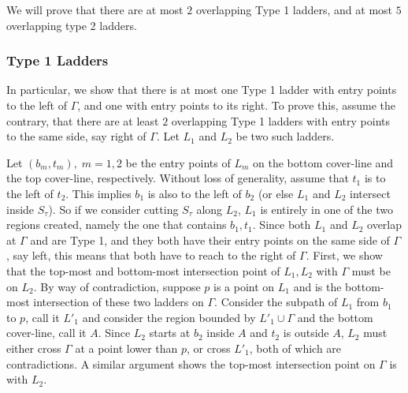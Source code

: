 \documentclass[pdflatex,sn-mathphys-num]{sn-jnl}
\theoremstyle{thmstyleone}
\begin{document}
    We will prove that there are at most $2$ overlapping Type 1 ladders, and at most $5$ overlapping type 2 ladders.

    \subsubsection*{Type 1 Ladders}
    In particular, we show that there is at most one Type 1 ladder with entry points to the left of $\Gamma$, and one with entry points to its right.
    To prove this, assume the contrary, that there are at least $2$ overlapping 
    Type 1 ladders with entry points to the same side, say right of $\Gamma$. Let $L_1$ and $L_2$ be two such ladders. 
   
    Let $(b_m, t_m),\; m = 1,2$ be the entry points of $L_m$ on the bottom cover-line and the top cover-line, respectively. Without loss of generality, assume that $t_1$ is to the left of $t_2$. 
   This implies $b_1$ is also to the left of $b_2$ (or else $L_1$ and $L_2$ intersect inside $S_\tau$). So if we consider cutting $S_\tau$ along $L_2$, $L_1$ is entirely in one of the two regions created, namely the one that contains $b_1,t_1$.     
    Since both $L_1$ and $L_2$ overlap at $\Gamma$ and are Type 1, and they both have their entry points on the same side of $\Gamma$, say  left, this means that both have to reach to the right of $\Gamma$. 
    First, we show that the top-most and bottom-most intersection point of $L_1,L_2$ with $\Gamma$ must be on $L_2$. By way of contradiction, suppose $p$ is a point on $L_1$ and is the bottom-most intersection of these two ladders on $\Gamma$. Consider the subpath of $L_1$ from $b_1$ to $p$, call it $L'_1$ and consider the region bounded by $L'_1\cup\Gamma$ and the bottom cover-line, call it $A$. Since $L_2$ starts at $b_2$ inside $A$ and $t_2$ is outside $A$, $L_2$ must either cross $\Gamma$ at a point lower than $p$, or cross $L'_1$, both of which are contradictions. A similar argument shows the top-most intersection point on $\Gamma$ is with $L_2$.
    
\end{document}
